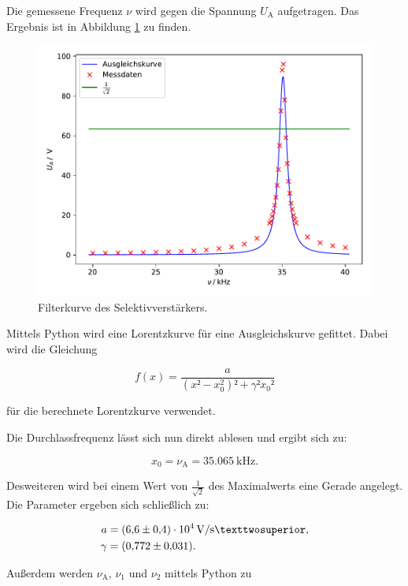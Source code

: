 Die gemessene Frequenz $\nu$ wird gegen die Spannung $U_\text{A}$ aufgetragen. Das 
Ergebnis ist in Abbildung \ref{fig:plot1} zu finden. 

\begin{figure}
  \centering
  \includegraphics{content/plot1.pdf}
  \caption{Filterkurve des Selektivverstärkers.}
  \label{fig:plot1}
\end{figure}

Mittels Python wird eine Lorentzkurve für eine Ausgleichskurve 
gefittet. Dabei wird die Gleichung 

\begin{equation*}
f(x) = \frac{a}{(x²-x_0^2)²+\gamma²x_0²}
\end{equation*}

für die berechnete Lorentzkurve verwendet. 

Die Durchlassfrequenz lässt sich nun direkt ablesen und ergibt sich zu:

\begin{equation}
x_0 = \nu _\text{A} = \SI{35.065}{\kilo\hertz}.
\end{equation}

Desweiteren wird bei einem Wert von $\frac{1}{\sqrt{2}}$ des Maximalwerts
eine Gerade angelegt. Die Parameter ergeben sich schließlich zu: 

\begin{align*}
a &= \SI{6.6+-0.4e4}{\volt\per\second²},\\
\gamma &= \SI{0.772+-0.031}{}.
\end{align*}

Außerdem werden $\nu_\text{A}$, $\nu_1$ und $\nu_2$ mittels Python zu

